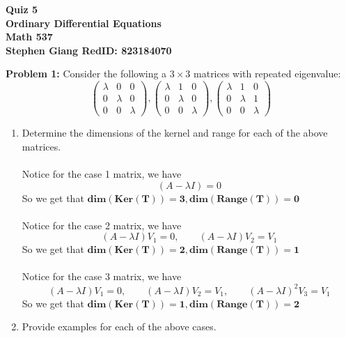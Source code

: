 \documentclass[11pt]{article}
\newcommand{\skipline}{\vspace{\baselineskip}}
\newenvironment{problem}[1]{\textbf{Problem #1: }}{\newpage}
\begin{document}
	
	\begin{center}
		\textbf{Quiz 5} \\
		\textbf{Ordinary Differential Equations} \\
		\textbf{Math 537} \\
		\textbf{Stephen Giang RedID: 823184070} \\
		\skipline \skipline
	\end{center}

	\begin{problem}{1}
		 Consider the following a $3 \times 3$ matrices with repeated eigenvalue:
		 \[\begin{pmatrix}
		 	\lambda & 0 & 0 \\
		 	0 & \lambda & 0 \\
		 	0 & 0 & \lambda
		 \end{pmatrix}, \begin{pmatrix}
			 \lambda & 1 & 0 \\
			 0 & \lambda & 0 \\
			 0 & 0 & \lambda
		 \end{pmatrix}, \begin{pmatrix}
			 \lambda & 1 & 0 \\
			 0 & \lambda & 1 \\
			 0 & 0 & \lambda
		 \end{pmatrix}\]
	 	\begin{enumerate}[label = (\alph*)]
	 		\item  Determine the dimensions of the kernel and range for each
	 		of the above matrices.
	 		\\ \\
	 		Notice for the case 1 matrix, we have 
	 		\[(A - \lambda I) = 0\]
	 		So we get that $\boldsymbol{dim(Ker(T)) = 3, dim(Range(T)) = 0}$
	 		\\ \\
	 		Notice for the case 2 matrix, we have 
	 		\[(A - \lambda I)V_1 = 0, \qquad (A - \lambda I)V_2 = V_1\]
	 		So we get that $\boldsymbol{dim(Ker(T)) = 2, dim(Range(T)) = 1}$
	 		\\ \\
	 		Notice for the case 3 matrix, we have 
	 		\[(A - \lambda I)V_1 = 0, \qquad (A - \lambda I)V_2 = V_1, \qquad (A - \lambda I)^2 V_3 = V_1\]
	 		So we get that $\boldsymbol{dim(Ker(T)) = 1, dim(Range(T)) = 2}$
	 		\newpage
	 		\item Provide examples for each of the above cases.
	 		\\ \\

\end{enumerate}
\end{problem}
\end{document}
